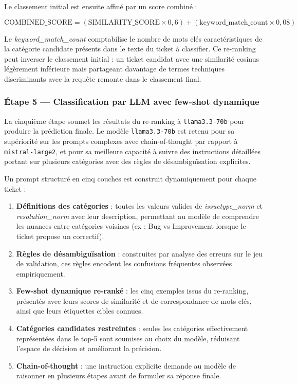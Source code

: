 Le classement initial est ensuite affiné par un score combiné :

$$\text{COMBINED\_SCORE} = (\text{SIMILARITY\_SCORE} \times 0{,}6) + (\text{keyword\_match\_count} \times 0{,}08)$$

Le \textit{keyword\_match\_count} comptabilise le nombre de mots clés caractéristiques de la catégorie candidate présents dans le texte du ticket à classifier. Ce re-ranking peut inverser le classement initial : un ticket candidat avec une similarité cosinus légèrement inférieure mais partageant davantage de termes techniques discriminants avec la requête remonte dans le classement final.

\subsubsection{Étape 5 — Classification par LLM avec few-shot dynamique}

La cinquième étape soumet les résultats du re-ranking à \texttt{llama3.3-70b} pour produire la prédiction finale. Le modèle \texttt{llama3.3-70b} est retenu pour sa supériorité sur les prompts complexes avec chain-of-thought par rapport à \texttt{mistral-large2}, et pour sa meilleure capacité à suivre des instructions détaillées portant sur plusieurs catégories avec des règles de désambiguïsation explicites.

Un prompt structuré en cinq couches est construit dynamiquement pour chaque ticket :

\begin{enumerate}
    \item \textbf{Définitions des catégories} : toutes les valeurs valides de \textit{issuetype\_norm} et \textit{resolution\_norm} avec leur description, permettant au modèle de comprendre les nuances entre catégories voisines (ex : Bug vs Improvement lorsque le ticket propose un correctif).
    \item \textbf{Règles de désambiguïsation} : construites par analyse des erreurs sur le jeu de validation, ces règles encodent les confusions fréquentes observées empiriquement.
    \item \textbf{Few-shot dynamique re-ranké} : les cinq exemples issus du re-ranking, présentés avec leurs scores de similarité et de correspondance de mots clés, ainsi que leurs étiquettes cibles connues.
    \item \textbf{Catégories candidates restreintes} : seules les catégories effectivement représentées dans le top-5 sont soumises au choix du modèle, réduisant l'espace de décision et améliorant la précision.
    \item \textbf{Chain-of-thought} : une instruction explicite demande au modèle de raisonner en plusieurs étapes avant de formuler sa réponse finale.
\end{enumerate}

